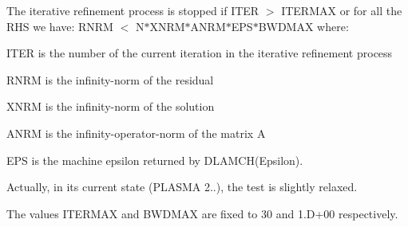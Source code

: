 The iterative refinement process is stopped if I\+T\+E\+R $>$ I\+T\+E\+R\+M\+A\+X or for all the R\+H\+S we have\+: R\+N\+R\+M $<$ N$\ast$\+X\+N\+R\+M$\ast$\+A\+N\+R\+M$\ast$\+E\+P\+S$\ast$\+B\+W\+D\+M\+A\+X where\+:


\begin{DoxyItemize}
\item I\+T\+E\+R is the number of the current iteration in the iterative refinement process
\item R\+N\+R\+M is the infinity-\/norm of the residual
\item X\+N\+R\+M is the infinity-\/norm of the solution
\item A\+N\+R\+M is the infinity-\/operator-\/norm of the matrix A
\item E\+P\+S is the machine epsilon returned by D\+L\+A\+M\+C\+H(\textquotesingle{}Epsilon\textquotesingle{}).
\end{DoxyItemize}

Actually, in its current state (P\+L\+A\+S\+M\+A 2..), the test is slightly relaxed.

The values I\+T\+E\+R\+M\+A\+X and B\+W\+D\+M\+A\+X are fixed to 30 and 1.\+D+00 respectively.


